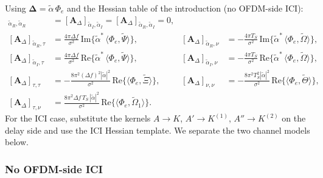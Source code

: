 \documentclass[11pt]{article}
\begin{document}
Using \(\bm{\Delta} = \tilde{\alpha}\, \Phi_e\) and the Hessian table of the introduction (no OFDM-side ICI):
\begin{align}
    [\bm{A}_\Delta]_{\tilde{\alpha}_R, \tilde{\alpha}_R} &= [\bm{A}_\Delta]_{\tilde{\alpha}_I, \tilde{\alpha}_I} = [\bm{A}_\Delta]_{\tilde{\alpha}_R, \tilde{\alpha}_I} = 0, \\
    [\bm{A}_\Delta]_{\tilde{\alpha}_R, \tau} &= \tfrac{4\pi\Delta f}{\sigma^2}\, \mathrm{Im}\{\tilde{\alpha}^*\, \langle \Phi_e, \tilde{\Psi}\rangle\}, &
    [\bm{A}_\Delta]_{\tilde{\alpha}_R, \nu} &= -\tfrac{4\pi T_S}{\sigma^2}\, \mathrm{Im}\{\tilde{\alpha}^*\, \langle \Phi_e, \tilde{\Omega}\rangle\}, \\
    [\bm{A}_\Delta]_{\tilde{\alpha}_I, \tau} &= \tfrac{4\pi\Delta f}{\sigma^2}\, \mathrm{Re}\{\tilde{\alpha}^*\, \langle \Phi_e, \tilde{\Psi}\rangle\}, &
    [\bm{A}_\Delta]_{\tilde{\alpha}_I, \nu} &= -\tfrac{4\pi T_S}{\sigma^2}\, \mathrm{Re}\{\tilde{\alpha}^*\, \langle \Phi_e, \tilde{\Omega}\rangle\}, \\
    [\bm{A}_\Delta]_{\tau, \tau} &= -\tfrac{8\pi^2 (\Delta f)^2 |\tilde{\alpha}|^2}{\sigma^2}\, \mathrm{Re}\{\langle \Phi_e, \tilde{\Xi}\rangle\}, &
    [\bm{A}_\Delta]_{\nu, \nu} &= -\tfrac{8\pi^2 T_S^2 |\tilde{\alpha}|^2}{\sigma^2}\, \mathrm{Re}\{\langle \Phi_e, \tilde{\Theta}\rangle\}, \\
    [\bm{A}_\Delta]_{\tau, \nu} &= \tfrac{8\pi^2 \Delta f\, T_S\, |\tilde{\alpha}|^2}{\sigma^2}\, \mathrm{Re}\{\langle \Phi_e, \tilde{\Omega}_1\rangle\}. & &
\end{align}
For the ICI case, substitute the kernels \(A \to K\), \(A' \to K^{(1)}\), \(A'' \to K^{(2)}\) on the delay side and use the ICI Hessian template. We separate the two channel models below.

\subsubsection{No OFDM-side ICI}
\end{document}

